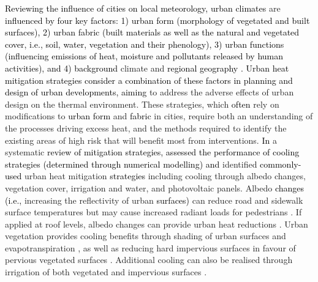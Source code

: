 \documentclass[final,3p,times,authoryear]{elsarticle}
\newcommand{\add}[1]{\textcolor{black}{#1}}
\newcommand{\remove}[1]{\textcolor{red}{\st{}}}
\begin{document}
\add{Reviewing the influence of cities on local meteorology, urban climates} are \add{influenced by four key factors: 1) urban form (morphology of vegetated and built surfaces), 2) urban fabric (built materials as well as the natural and vegetated cover, i.e., soil, water, vegetation and their phenology), 3) urban functions (influencing emissions of heat, moisture and pollutants released by human activities), and 4) background} climate\remove{sensitive} and \remove{better able}\add{regional geography \citep{Masson2020a,mills2021characterising}. Urban heat mitigation strategies consider a combination of these factors in planning and design of urban developments, aiming} to address the adverse effects of urban design on the thermal environment. These strategies, which \add{often} rely on modifications to \remove{built form, fabric,}\add{urban form} and \remove{natural land cover}\add{fabric} in cities, require both an understanding of the processes driving excess heat, and the methods required to identify the existing areas of high risk that will benefit most from interventions. \remove{, in}\add{In} a systematic \remove{review,}\add{review of mitigation strategies, \cite{Krayenhoff2021} assessed the performance of cooling strategies (determined through numerical modelling) and} identified \remove{commonly used}\add{commonly-used} urban heat mitigation \remove{strategies,}\add{strategies} including cooling through albedo changes, vegetation cover, irrigation and water, and photovoltaic panels. Albedo \remove{changes,}\add{changes (i.e.,} increasing the reflectivity of urban \remove{surfaces,}\add{surfaces)} can reduce road and sidewalk surface temperatures but may cause increased radiant loads for pedestrians \citep{Middel2020}. If applied at roof levels, albedo changes can provide urban heat reductions \citep{Jacobs2018Roof}. Urban vegetation provides cooling benefits through shading of urban surfaces and evapotranspiration \citep{Bowler2010,Coutts2012,Coutts2015}, as well as reducing hard impervious surfaces in favour of pervious vegetated surfaces \citep{Middel2019a}. Additional cooling can also be realised through irrigation of both vegetated \citep{Broadbent2017a,Cheung2021} and impervious surfaces \citep{Hendel2016,Solcerova2018}.
\end{document}
